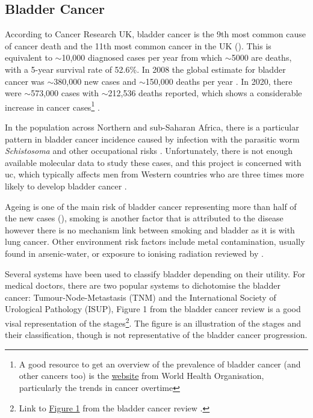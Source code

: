 \subsection{Bladder Cancer} \label{s:lit:bladder_cancer}

According to Cancer Research UK, bladder cancer is the 9th most common cause of cancer death and the 11th most common cancer in the UK (\citeyear{Cancer_Research_UK2015-cf}). This is equivalent to $\sim$10,000 diagnosed cases per year from which  $\sim$5000 are deaths, with a 5-year survival rate of 52.6\%. In 2008 the global estimate for bladder cancer was $\sim$380,000 new cases and $\sim$150,000 deaths per year \citep{Ferlay2010-sx}. In 2020, there were $\sim$573,000 cases with $\sim$212,536 deaths reported, which shows a considerable increase in cancer cases\footnote{A good resource to get an overview of the prevalence of bladder cancer (and other cancers too) is the \href{https://gco.iarc.fr/en}{website} from World Health Organisation, particularly the trends in cancer overtime} \citep{Sung2021-hn}. 

In the population across Northern and sub-Saharan Africa, there is a particular pattern in bladder cancer incidence caused by infection with the parasitic worm \textit{Schistosoma} and other occupational risks \citep{Ferlay2010-sx}. Unfortunately, there is not enough available molecular data to study these cases, and this project is concerned with \acrfull{uc}, which typically affects men from Western countries who are three times more likely to develop bladder cancer \citep{Knowles2015-mu}.
 

Ageing is one of the main risk of bladder cancer representing more than half of the new cases (\citeyear{Cancer_Research_UK2015-cf}), smoking is another factor that is attributed to the disease \citep{Knowles2015-mu} however there is no mechanism link between smoking and bladder as it is with lung cancer. Other environment risk factors include metal contamination, usually found in arsenic-water, or exposure to ionising radiation reviewed by \citep{Knowles2015-mu}. 

Several systems have been used to classify bladder depending on their utility. For medical doctors, there are two popular systems to dichotomise the bladder cancer: Tumour-Node-Metastasis (TNM) and the International Society of Urological Pathology (ISUP), Figure 1 from the bladder cancer review \citep{Knowles2015-mu} is a good visal representation of the stages\footnote{Link to \href{https://www.nature.com/articles/nrc3817/figures/1}{Figure 1} from the bladder cancer review \citep{Knowles2015-mu}.}. The figure is an illustration of the stages and their classification, though is not representative of the bladder cancer progression.


